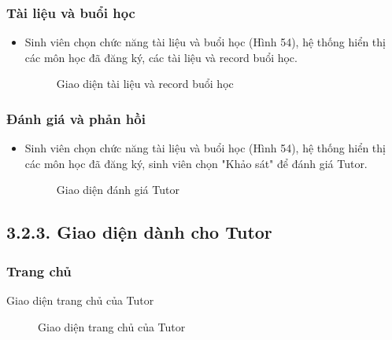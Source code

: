 \subsubsection*{Tài liệu và buổi học}
\begin{itemize}
    \item Sinh viên chọn chức năng tài liệu và buổi học (Hình 54), hệ thống hiển thị các môn học đã đăng ký, các tài liệu và record buổi học. 
    \begin{figure}[H]
    \centering
    \setlength{\fboxsep}{2pt}     
    \setlength{\fboxrule}{0.5pt}   
    \caption{Giao diện tài liệu và record buổi học}
    \end{figure}
\end{itemize}

\subsubsection*{Đánh giá và phản hồi}
\begin{itemize}
    \item Sinh viên chọn chức năng tài liệu và buổi học (Hình 54), hệ thống hiển thị các môn học đã đăng ký, sinh viên chọn "Khảo sát" để đánh giá Tutor. 
    \begin{figure}[H]
    \centering
    \setlength{\fboxsep}{2pt}     
    \setlength{\fboxrule}{0.5pt}   
    \caption{Giao diện đánh giá Tutor}
    \end{figure}
\end{itemize}

\subsection*{3.2.3. Giao diện dành cho Tutor}

\subsubsection*{Trang chủ}
Giao diện trang chủ của Tutor
\begin{figure}[H]
    \centering
    \setlength{\fboxsep}{2pt}     
    \setlength{\fboxrule}{0.5pt}   
    \caption{Giao diện trang chủ của Tutor}
\end{figure}

